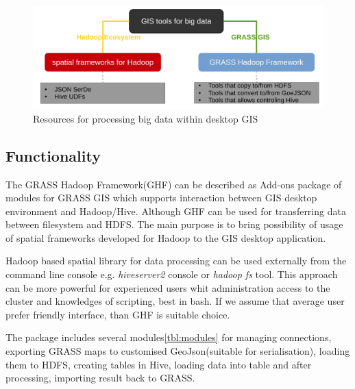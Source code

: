 \documentclass[a4paper,12pt,oneside]{report}
\begin{document}
  \begin{figure}[!htbp]
    \centering
    \includegraphics[width=1\textwidth]{./img/idea_schema.pdf}
    \caption[Resources]{\centering Resources for processing big data within desktop GIS}
 \end{figure} 

				
\subsection{Functionality}
The GRASS Hadoop Framework(GHF) can be described as Add-ons package of modules for GRASS GIS which supports interaction between GIS desktop environment and Hadoop/Hive. Although GHF can be used for transferring data between filesystem and HDFS. The main purpose is to bring possibility of usage of spatial frameworks developed for Hadoop to the GIS desktop application. 

Hadoop based spatial library for data processing can be used externally from the command line console e.g. \textit{hiveserver2} console or \textit{hadoop fs} tool. This approach can be more powerful for experienced users whit administration access to the cluster and knowledges of scripting, best in bash. If we assume that average user prefer friendly interface, than GHF is suitable choice. 

The package includes several modules\ref{tbl:modules} for managing connections, exporting GRASS maps to customised GeoJson(suitable for serialisation), loading them to HDFS, creating tables in Hive, loading data into table and after processing, importing result back to GRASS.
\end{document}
